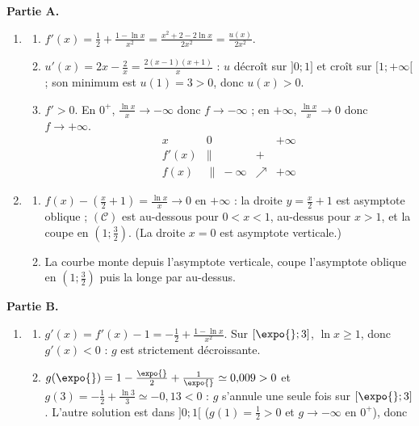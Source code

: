 \begin{corrige}
\begin{sol}
\textbf{Partie A.}
\begin{enumerate}
\item \begin{enumerate}
      \item $f'(x) = \frac{1}{2} + \frac{1 - \ln x}{x^2} = \frac{x^2 + 2 - 2\ln x}{2x^2} = \frac{u(x)}{2x^2}$.
      \item $u'(x) = 2x - \frac{2}{x} = \frac{2(x-1)(x+1)}{x}$ : $u$ d\'ecro\^it sur $]0;1]$ et cro\^it sur $[1;+\infty[$ ; son minimum est $u(1) = 3 > 0$, donc $u(x) > 0$.
      \item $f' > 0$. En $0^+$, $\frac{\ln x}{x} \to -\infty$ donc $f \to -\infty$ ; en $+\infty$, $\frac{\ln x}{x} \to 0$ donc $f \to +\infty$.
            \[
            \begin{array}{c|ccc}
            x & 0 & & +\infty \\ \hline
            f'(x) & \| & + & \\ \hline
            f(x) & \| \; -\infty & \nearrow & +\infty
            \end{array}
            \]
      \end{enumerate}
\item \begin{enumerate}
      \item $f(x) - \left(\frac{x}{2} + 1\right) = \frac{\ln x}{x} \to 0$ en $+\infty$ : la droite $y = \frac{x}{2} + 1$ est asymptote oblique ;
            $(\mathcal{C})$ est au-dessous pour $0 < x < 1$, au-dessus pour $x > 1$, et la coupe en $\left(1;\frac{3}{2}\right)$.
            (La droite $x = 0$ est asymptote verticale.)
      \item La courbe monte depuis l'asymptote verticale, coupe l'asymptote oblique en $\left(1;\frac{3}{2}\right)$ puis la longe par au-dessus.
      \end{enumerate}
\end{enumerate}
\textbf{Partie B.}
\begin{enumerate}
\item \begin{enumerate}
      \item $g'(x) = f'(x) - 1 = -\frac{1}{2} + \frac{1 - \ln x}{x^2}$. Sur $[\expo{};3]$, $\ln x \geq 1$, donc $g'(x) < 0$ : $g$ est strictement d\'ecroissante.
      \item $g(\expo{}) = 1 - \frac{\expo{}}{2} + \frac{1}{\expo{}} \simeq 0{,}009 > 0$ et $g(3) = -\frac{1}{2} + \frac{\ln 3}{3} \simeq -0{,}13 < 0$ :
            $g$ s'annule une seule fois sur $[\expo{};3]$. L'autre solution est dans $]0;1[$ ($g(1) = \frac{1}{2} > 0$ et $g \to -\infty$ en $0^+$), donc

\end{enumerate}
\end{enumerate}
\end{sol}
\end{corrige}
